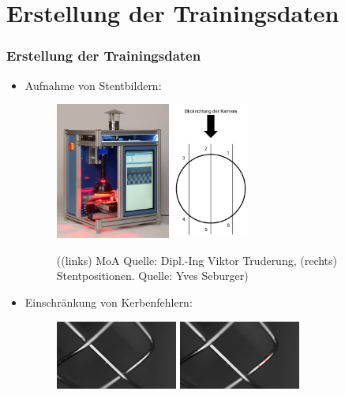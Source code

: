 \documentclass{beamer}
\begin{document}
\section{Erstellung der Trainingsdaten}
\begin{frame}[allowframebreaks]
\frametitle{Erstellung der Trainingsdaten}
\begin{itemize}
    \item Aufnahme von Stentbildern: \newline
        \begin{figure}
            \includegraphics[height=4.5cm]{Bilder/MoA_Gesa_preversion_cut.jpg}
            \hspace{20px}
            \includegraphics[height=4.5cm]{Bilder/Stentpositionen.png}
            \caption{((links) MoA Quelle: Dipl.-Ing Viktor Truderung, (rechts) Stentpositionen. Quelle: Yves Seburger)}
        \end{figure}
\end{itemize}
\begin{itemize}
    \item Einschränkung von Kerbenfehlern: \newline
        \begin{figure}
            \includegraphics[width=4cm]{Bilder/Annotationfragen/Frage_5_crop.jpg}
            \includegraphics[width=4cm]{Bilder/Annotationfragen/Frage_5_anno.png}

\end{figure}
\end{itemize}
\end{frame}
\end{document}
